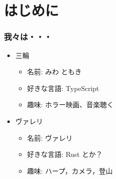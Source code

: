 \section{はじめに}
\begin{frame}
    \frametitle{我々は・・・}
    \begin{itemize}
        \item<4-> 三輪
        \begin{itemize}
            \item<5-> 名前: みわ ともき
            \item<6-> 好きな言語: TypeScript
            \item<7-> 趣味: ホラー映画、音楽聴く
        \end{itemize}
        \item<8-> ヴァレリ
        \begin{itemize}
            \item<9-> 名前: ヴァレリ
            \item<10-> 好きな言語: Rust とか？
            \item<11-> 趣味: ハープ，カメラ，登山
        \end{itemize}
    \end{itemize}
\end{frame}
